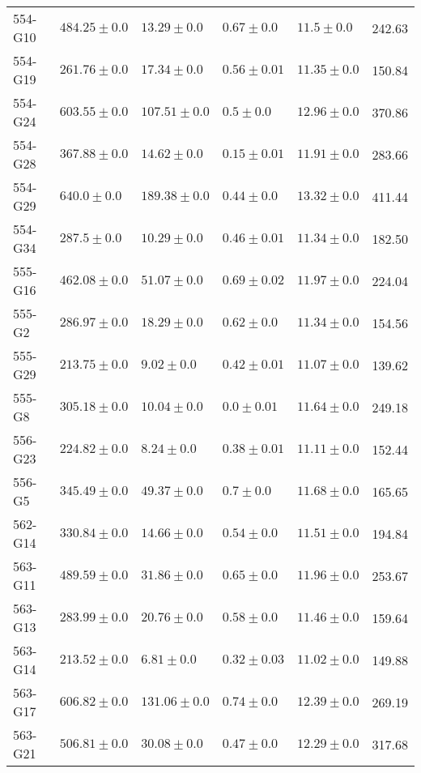\begin{tabular}{lllllr}
    554-G10 &     $484.25 \pm 0.0$ &       $13.29 \pm 0.0$ &   $0.67 \pm 0.0$ &   $11.5 \pm 0.0$ &    242.63 \\
    554-G19 &     $261.76 \pm 0.0$ &       $17.34 \pm 0.0$ &  $0.56 \pm 0.01$ &  $11.35 \pm 0.0$ &    150.84 \\
    554-G24 &     $603.55 \pm 0.0$ &      $107.51 \pm 0.0$ &    $0.5 \pm 0.0$ &  $12.96 \pm 0.0$ &    370.86 \\
    554-G28 &     $367.88 \pm 0.0$ &       $14.62 \pm 0.0$ &  $0.15 \pm 0.01$ &  $11.91 \pm 0.0$ &    283.66 \\
    554-G29 &      $640.0 \pm 0.0$ &      $189.38 \pm 0.0$ &   $0.44 \pm 0.0$ &  $13.32 \pm 0.0$ &    411.44 \\
    554-G34 &      $287.5 \pm 0.0$ &       $10.29 \pm 0.0$ &  $0.46 \pm 0.01$ &  $11.34 \pm 0.0$ &    182.50 \\
    555-G16 &     $462.08 \pm 0.0$ &       $51.07 \pm 0.0$ &  $0.69 \pm 0.02$ &  $11.97 \pm 0.0$ &    224.04 \\
     555-G2 &     $286.97 \pm 0.0$ &       $18.29 \pm 0.0$ &   $0.62 \pm 0.0$ &  $11.34 \pm 0.0$ &    154.56 \\
    555-G29 &     $213.75 \pm 0.0$ &        $9.02 \pm 0.0$ &  $0.42 \pm 0.01$ &  $11.07 \pm 0.0$ &    139.62 \\
     555-G8 &     $305.18 \pm 0.0$ &       $10.04 \pm 0.0$ &   $0.0 \pm 0.01$ &  $11.64 \pm 0.0$ &    249.18 \\
    556-G23 &     $224.82 \pm 0.0$ &        $8.24 \pm 0.0$ &  $0.38 \pm 0.01$ &  $11.11 \pm 0.0$ &    152.44 \\
     556-G5 &     $345.49 \pm 0.0$ &       $49.37 \pm 0.0$ &    $0.7 \pm 0.0$ &  $11.68 \pm 0.0$ &    165.65 \\
    562-G14 &     $330.84 \pm 0.0$ &       $14.66 \pm 0.0$ &   $0.54 \pm 0.0$ &  $11.51 \pm 0.0$ &    194.84 \\
    563-G11 &     $489.59 \pm 0.0$ &       $31.86 \pm 0.0$ &   $0.65 \pm 0.0$ &  $11.96 \pm 0.0$ &    253.67 \\
    563-G13 &     $283.99 \pm 0.0$ &       $20.76 \pm 0.0$ &   $0.58 \pm 0.0$ &  $11.46 \pm 0.0$ &    159.64 \\
    563-G14 &     $213.52 \pm 0.0$ &        $6.81 \pm 0.0$ &  $0.32 \pm 0.03$ &  $11.02 \pm 0.0$ &    149.88 \\
    563-G17 &     $606.82 \pm 0.0$ &      $131.06 \pm 0.0$ &   $0.74 \pm 0.0$ &  $12.39 \pm 0.0$ &    269.19 \\
    563-G21 &     $506.81 \pm 0.0$ &       $30.08 \pm 0.0$ &   $0.47 \pm 0.0$ &  $12.29 \pm 0.0$ &    317.68 \\

\end{tabular}
